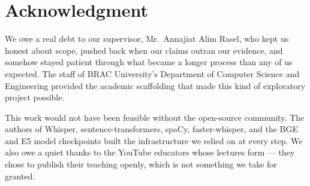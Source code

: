 \section*{Acknowledgment}

We owe a real debt to our supervisor, Mr.\ Annajiat Alim Rasel, who kept us
honest about scope, pushed back when our claims outran our evidence, and
somehow stayed patient through what became a longer process than any of us
expected. The staff of BRAC University's Department of Computer Science and
Engineering provided the academic scaffolding that made this kind of
exploratory project possible.

This work would not have been feasible without the open-source community.
The authors of Whisper, sentence-transformers, spaCy, faster-whisper, and
the BGE and E5 model checkpoints built the infrastructure we relied on at
every step. We also owe a quiet thanks to the YouTube educators whose
lectures form \dataset{} --- they chose to publish their teaching openly,
which is not something we take for granted.
